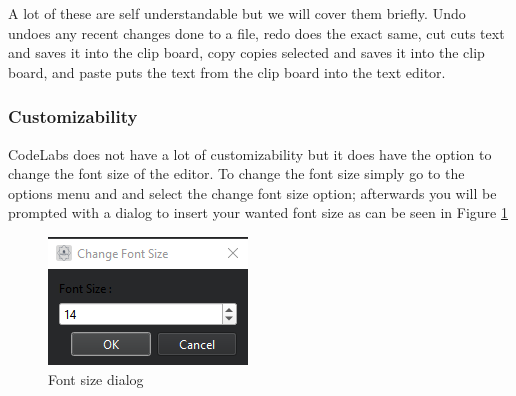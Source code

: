 \documentclass[a4paper, 11pt]{article}
\begin{document}
				\noindent A lot of these are self understandable but we will cover them briefly. Undo undoes any recent changes done to a file, redo does the exact same, cut cuts text and saves it into the clip board, copy copies selected and saves it into the clip board, and paste puts the text from the clip board into the text editor.
				
			\subsubsection{Customizability}
				\noindent CodeLabs does not have a lot of customizability but it does have the option to change the font size of the editor. To change the font size simply go to the options menu and and select the change font size option; afterwards you will be prompted with a dialog to insert your wanted font size as can be seen in Figure \ref{Fig:Font size dialog}
				
				\begin{figure}[h]
					\centering
					\includegraphics[scale = 1.4]{fontSizeDialog}
					\caption{Font size dialog}
					\label{Fig:Font size dialog}
				\end{figure}
				\pagebreak
\end{document}
